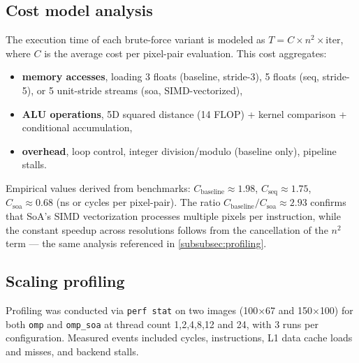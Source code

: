 \documentclass[10pt,twocolumn,letterpaper]{article}
\begin{document}
\begin{figure}
\begin{center}
    \end{center}
\end{figure}


\subsection{Cost model analysis}\label{subsec:cost_model}
The execution time of each brute-force variant is modeled as $T = C \times n^2 \times \text{iter}$, where $C$ is the average cost per pixel-pair evaluation. This cost aggregates:
\begin{itemize}
    \item \textbf{memory accesses}, loading 3 floats (baseline, stride-3), 5 floats (seq, stride-5), or 5 unit-stride streams (soa, SIMD-vectorized),
    \item \textbf{ALU operations}, 5D squared distance (14 FLOP) + kernel comparison + conditional accumulation,
    \item \textbf{overhead}, loop control, integer division/modulo (baseline only), pipeline stalls.
\end{itemize}
Empirical values derived from benchmarks: $C_{\text{baseline}} \approx 1.98$, $C_{\text{seq}} \approx 1.75$, $C_{\text{soa}} \approx 0.68$ (ns or cycles per pixel-pair). The ratio $C_{\text{baseline}} / C_{\text{soa}} \approx 2.93$ confirms that SoA's SIMD vectorization processes multiple pixels per instruction, while the constant speedup across resolutions follows from the cancellation of the $n^2$ term — the same analysis referenced in \cref{subsubsec:profiling}.

\subsection{Scaling profiling}\label{subsec:scaling_profiling}
Profiling was conducted via \texttt{perf stat} on two images (100$\times$67 and 150$\times$100) for both \texttt{omp} and \texttt{omp\_soa} at thread count 1,2,4,8,12 and 24, with 3 runs per configuration. Measured events included cycles, instructions, L1 data cache loads and misses, and backend stalls.
\end{document}
